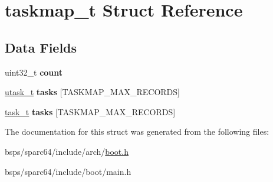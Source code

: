 \hypertarget{structtaskmap__t}{}\section{taskmap\+\_\+t Struct Reference}
\label{structtaskmap__t}
\subsection*{Data Fields}
\begin{DoxyCompactItemize}
\item 
\mbox{\label{structtaskmap__t_aed64c961bd374f67f91ccecb9f2dd3ed}} 
uint32\+\_\+t {\bfseries count}
\item 
\mbox{\label{structtaskmap__t_a3cd49f86a00dfb725566b7b1859445b1}} 
\mbox{\hyperlink{structutask__t}{utask\+\_\+t}} {\bfseries tasks} \mbox{[}T\+A\+S\+K\+M\+A\+P\+\_\+\+M\+A\+X\+\_\+\+R\+E\+C\+O\+R\+DS\mbox{]}
\item 
\mbox{\label{structtaskmap__t_a8f4cdbafe4d367c3215079e662c7e3ac}} 
\mbox{\hyperlink{structtask__t}{task\+\_\+t}} {\bfseries tasks} \mbox{[}T\+A\+S\+K\+M\+A\+P\+\_\+\+M\+A\+X\+\_\+\+R\+E\+C\+O\+R\+DS\mbox{]}
\end{DoxyCompactItemize}


The documentation for this struct was generated from the following files\+:\begin{DoxyCompactItemize}
\item 
bsps/sparc64/include/arch/\mbox{\hyperlink{sparc64_2include_2arch_2boot_8h}{boot.\+h}}\item 
bsps/sparc64/include/boot/main.\+h\end{DoxyCompactItemize}
